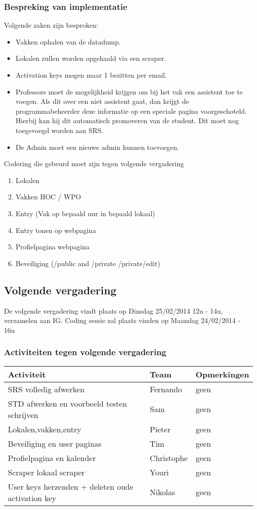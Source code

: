 \subsubsection{Bespreking van implementatie}
Volgende zaken zijn besproken:
\begin{itemize}
	\item Vakken ophalen van de datadump.
	\item Lokalen zullen worden opgehaald via een scraper.
	\item Activation keys mogen maar 1 bezitten per email.
	\item Professors moet de mogelijkheid krijgen om bij het vak een assistent toe te voegen. Als dit over een niet assistent gaat, dan krijgt de programmabeheerder deze informatie op een speciale pagina voorgeschoteld. Hierbij kan hij dit automatisch promoveren van de student. Dit moet nog toegevoegd worden aan SRS.
	\item De Admin moet een nieuwe admin kunnen toevoegen.
\end{itemize}

Codering die gebeurd moet zijn tegen volgende vergadering
\begin{enumerate}
	\item Lokalen
	\item Vakken HOC / WPO
	\item Entry (Vak op bepaald uur in bepaald lokaal)
	\item Entry tonen op webpagina
	\item Profielpagina webpagina
	\item Beveiliging (/public and /private /private/edit)
\end{enumerate}

\subsection{Volgende vergadering}
De volgende vergadering vindt plaats op Dinsdag 25/02/2014 12u - 14u, verzamelen aan IG.
Coding sessie zal plaats vinden op Maandag 24/02/2014 - 16u
\subsubsection{Activiteiten tegen volgende vergadering} \label{sec:TODOActiviteiten}
\begin{table} [H]
	\centering
	\begin{tabular} {l|l|l}
		\textbf{Activiteit} & \textbf{Team} & \textbf{Opmerkingen} \\
		\hline
		SRS volledig afwerken & Fernando & geen \\
		STD afwerken en voorbeeld testen schrijven & Sam & geen \\
		Lokalen,vakken,entry & Pieter & geen \\
		Beveiliging en user paginas & Tim & geen \\
		Profielpagina en kalender & Christophe & geen \\
		Scraper lokaal scraper & Youri & geen \\
		User keys herzenden + deleten oude activation key & Nikolas & geen \\
	\end{tabular}
\end{table}

